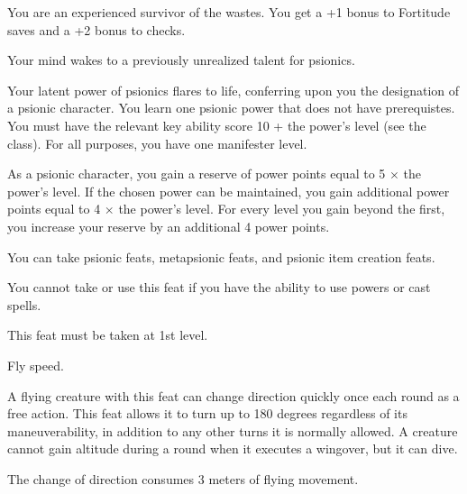 {You are an experienced survivor of the wastes.}{}
{You get a +1 bonus to Fortitude saves and a +2 bonus to  checks.}{}{}

{Your mind wakes to a previously unrealized talent for psionics.}
{}
{Your latent power of psionics flares to life, conferring upon you the designation of a psionic character. You learn one psionic power that does not have prerequistes. You must have the relevant key ability score 10 + the power's level (see the  class). For all purposes, you have one manifester level.

As a psionic character, you gain a reserve of power points equal to 5 $\times$ the power's level. If the chosen power can be maintained, you gain additional power points equal to 4 $\times$ the power's level. For every level you gain beyond the first, you increase your reserve by an additional 4 power points.

You can take psionic feats, metapsionic feats, and psionic item creation feats.}
{}
{You cannot take or use this feat if you have the ability to use powers or cast spells.

This feat must be taken at 1st level.}

{Fly speed.}
{A flying creature with this feat can change direction quickly once each round as a free action. This feat allows it to turn up to 180 degrees regardless of its maneuverability, in addition to any other turns it is normally allowed. A creature cannot gain altitude during a round when it executes a wingover, but it can dive.

The change of direction consumes 3 meters of flying movement.}

